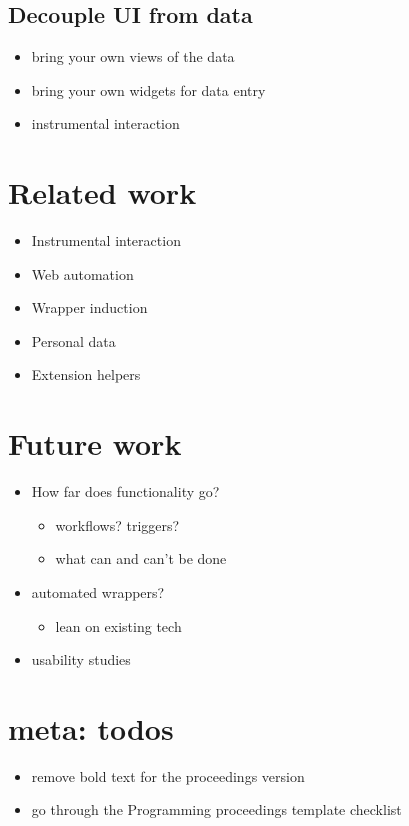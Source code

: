 \documentclass[english,submission]{programming}
\providecommand{\tightlist}{%
  \setlength{\itemsep}{0pt}\setlength{\parskip}{0pt}}
\begin{document}
\hypertarget{decouple-ui-from-data}{%
\subsection{Decouple UI from data}\label{decouple-ui-from-data}}

\begin{itemize}
\tightlist
\item
  bring your own views of the data
\item
  bring your own widgets for data entry
\item
  instrumental interaction
\end{itemize}

\hypertarget{related-work}{%
\section{Related work}\label{related-work}}

\begin{itemize}
\tightlist
\item
  Instrumental interaction
\item
  Web automation
\item
  Wrapper induction
\item
  Personal data
\item
  Extension helpers
\end{itemize}

\hypertarget{future-work}{%
\section{Future work}\label{future-work}}

\begin{itemize}
\tightlist
\item
  How far does functionality go?

  \begin{itemize}
  \tightlist
  \item
    workflows? triggers?
  \item
    what can and can't be done
  \end{itemize}
\item
  automated wrappers?

  \begin{itemize}
  \tightlist
  \item
    lean on existing tech
  \end{itemize}
\item
  usability studies
\end{itemize}

\hypertarget{meta-todos}{%
\section{meta: todos}\label{meta-todos}}

\begin{itemize}
\tightlist
\item
  remove bold text for the proceedings version
\item
  go through the Programming proceedings template checklist
\end{itemize}

\acks
\printbibliography
\end{document}
